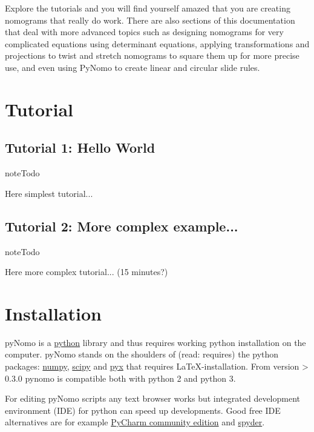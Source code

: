 \documentclass[a4paper,11pt,english]{sphinxmanual}
\begin{document}
Explore the tutorials and you will find yourself amazed that you are creating nomograms that really do work. There are also sections of this documentation that deal with more advanced topics such as designing nomograms for very complicated equations using determinant equations, applying transformations and projections to twist and stretch nomograms to square them up for more precise use, and even using PyNomo to create linear and circular slide rules.


\chapter{Tutorial}
\label{tutorials/tutorials::doc}\label{tutorials/tutorials:tutorial}

\section{Tutorial 1: Hello World}
\label{tutorials/tutorials:tutorial-1-hello-world}
\begin{notice}{note}{Todo}

Here simplest tutorial...
\end{notice}


\section{Tutorial 2: More complex example...}
\label{tutorials/tutorials:tutorial-2-more-complex-example}
\begin{notice}{note}{Todo}

Here more complex tutorial... (15 minutes?)
\end{notice}


\chapter{Installation}
\label{installation/installation:installation}\label{installation/installation::doc}
pyNomo is a  \href{https://www.python.org}{python} library and thus requires working python installation on the computer.
pyNomo stands on the shoulders  of (read: requires) the python packages: \href{http://www.numpy.org}{numpy}, \href{http://www.scipy.org}{scipy} and
\href{http://pyx.sourceforge.net}{pyx} that requires LaTeX-installation. From version \textgreater{} 0.3.0 pynomo is compatible both with python 2 and python 3.

For editing pyNomo scripts any text browser works but integrated development environment (IDE) for python can speed up developments.
Good free IDE alternatives are for example \href{https://www.jetbrains.com/pycharm/}{PyCharm community edition} and \href{https://github.com/spyder-ide/spyder}{spyder}.
\end{document}
